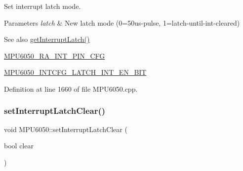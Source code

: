 Set interrupt latch mode. 
\begin{DoxyParams}{Parameters}
{\em latch} & New latch mode (0=50us-\/pulse, 1=latch-\/until-\/int-\/cleared) \\
\hline
\end{DoxyParams}
\begin{DoxySeeAlso}{See also}
\mbox{\hyperlink{classMPU6050_a5502c4c2a9bc4ea9267e128b7743923d}{get\+Interrupt\+Latch()}} 

\mbox{\hyperlink{MPU6050_8h_a82344e1daef2bac2e0d938319528be6c}{M\+P\+U6050\+\_\+\+R\+A\+\_\+\+I\+N\+T\+\_\+\+P\+I\+N\+\_\+\+C\+FG}} 

\mbox{\hyperlink{MPU6050_8h_a5704a7815c0fa6dcbfd4666a70e89d90}{M\+P\+U6050\+\_\+\+I\+N\+T\+C\+F\+G\+\_\+\+L\+A\+T\+C\+H\+\_\+\+I\+N\+T\+\_\+\+E\+N\+\_\+\+B\+IT}} 
\end{DoxySeeAlso}


Definition at line 1660 of file M\+P\+U6050.\+cpp.


\begin{DoxyCode}{0}

\end{DoxyCode}
\mbox{\label{classMPU6050_a2fa64c7030242aac18bd6727e8ca4a54}} 
\subsubsection{\texorpdfstring{setInterruptLatchClear()}{setInterruptLatchClear()}}
{\footnotesize\ttfamily void M\+P\+U6050\+::set\+Interrupt\+Latch\+Clear (\begin{DoxyParamCaption}\item[{bool}]{clear }\end{DoxyParamCaption})}

